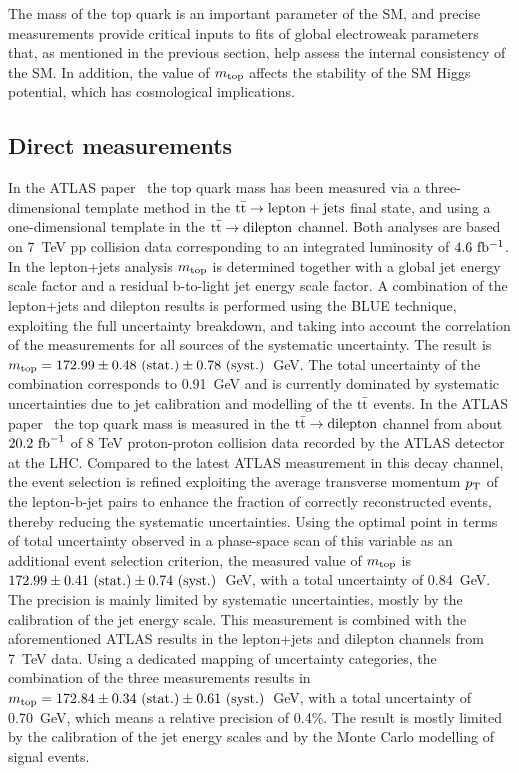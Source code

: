 \documentclass{blois}
\begin{document}
The mass of the top quark is an important parameter of the SM, and precise
measurements provide critical inputs to fits of global electroweak parameters
that, as mentioned in the previous section, help assess the internal consistency
of the SM. In addition, the value of $m_{\rm top}$ affects the stability of the
SM Higgs potential, which has cosmological implications.


\subsection{Direct measurements}

In the ATLAS paper~\cite{bib:ATLAS-topMass7TeV} the top quark mass has been
measured via a three-dimensional template method in the ${\rm t{\bar t}\to \rm lepton+jets}$
final state, and using a one-dimensional template in the ${\rm t{\bar t}\to dilepton}$
channel. Both analyses are based on 7~TeV pp collision data
corresponding to an integrated luminosity of $4.6~{\rm fb^{-1}}$.
In the lepton+jets analysis $m_{\rm top}$ is determined together with a global
jet energy scale factor and a residual b-to-light jet energy scale factor. A
combination of the lepton+jets and dilepton results is performed using the BLUE
technique, exploiting the full uncertainty breakdown, and taking into account the
correlation of the measurements for all sources of the systematic uncertainty.
The result is $m_{\rm top} = 172.99 \pm 0.48~({\rm stat.}) \pm 0.78~({\rm syst.})$~GeV.
The total uncertainty of the combination corresponds to 0.91~GeV and is currently
dominated by systematic uncertainties due to jet calibration and modelling of the
${\rm t{\bar t}}$ events. In the ATLAS paper~\cite{bib:ATLAS-topMassDilepton8TeV}
the top quark mass is measured in the ${\rm t{\bar t}\to dilepton}$ channel from
about $20.2~{\rm fb}^{-1}$ of 8 TeV proton-proton collision data recorded by the
ATLAS detector at the LHC. Compared to the latest ATLAS measurement in this decay
channel, the event selection is refined exploiting the average transverse
momentum $p_{\rm T}$ of the lepton-b-jet pairs to enhance the fraction of
correctly reconstructed events, thereby reducing the systematic uncertainties.
Using the optimal point in terms of total uncertainty observed in a phase-space
scan of this variable as an additional event selection criterion, the measured
value of $m_{\rm top}$ is $172.99\pm 0.41~({\rm stat.})\pm 0.74~({\rm syst.})$~GeV,
with a total uncertainty of 0.84~GeV. The precision is mainly limited by systematic
uncertainties, mostly by the calibration of the jet energy scale. This measurement
is combined with the aforementioned ATLAS results in the lepton+jets and dilepton
channels from 7~TeV data. Using a dedicated mapping of uncertainty categories, the
combination of the three measurements results in
$m_{\rm top} = 172.84 \pm 0.34~({\rm stat.}) \pm 0.61~({\rm syst.})$~GeV, with a
total uncertainty of 0.70~GeV, which means a relative precision of 0.4\%. The
result is mostly limited by the calibration of the jet energy scales and by the
Monte Carlo modelling of signal events.
\end{document}
